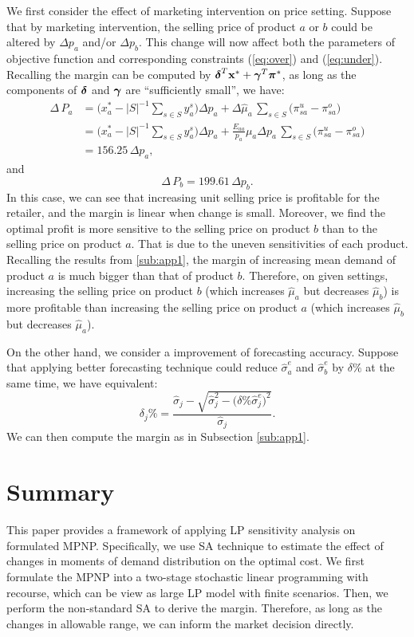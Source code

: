\documentclass[a4paper,11pt]{article}
\begin{document}
We first consider the effect of marketing intervention on price setting. Suppose that by marketing intervention, the selling price of product $a$ or $b$ could be altered by $\Delta p_a$ and/or $\Delta p_b$. This change will now affect both the parameters of objective function and corresponding constraints (\ref{eq:over}) and (\ref{eq:under}). Recalling the margin can be computed by $\mbox{\boldmath$\delta$}^T \mathbf{x}^* + \mbox{\boldmath$\gamma$}^T \mbox{\boldmath$\pi$}^*$,
as long as the components of $\mbox{\boldmath$\delta$}$ and $\mbox{\boldmath$\gamma$}$
are ``sufficiently small”, we have: 
\[
\begin{aligned}
    \Delta \, P_a &= \big( x_a^* - |S|^{-1} \sum_{s \in S} y_a^s \big) \Delta p_a + \Delta \hat{\mu}_a \, \sum_{s \in S} \big( \pi_{sa}^u - \pi_{sa}^o \big)\\
    &= \big( x_a^* - |S|^{-1} \sum_{s \in S} y_a^s \big) \Delta p_a + \frac{E_{aa}}{p_a}\mu_a \Delta p_a \, \sum_{s \in S} \big( \pi_{sa}^u - \pi_{sa}^o \big)\\
    &= 156.25 \, \Delta p_a,
\end{aligned}
\]
and
\[
\Delta \, P_b = 199.61 \, \Delta p_b.
\]
In this case, we can see that increasing unit selling price is profitable for the retailer, and the margin is linear when change is small. Moreover, we find the optimal profit is more sensitive to the selling price on product $b$ than to the selling price on product $a$. That is due to the uneven sensitivities of each product. Recalling the results from \ref{sub:app1}, the margin of increasing mean demand of product $a$ is much bigger than that of product $b$. Therefore, on given settings, increasing the selling price on product $b$ (which increases $\hat{\mu}_a$ but decreases $\hat{\mu}_b$) is more profitable than increasing the selling price on product $a$ (which increases $\hat{\mu}_b$ but decreases $\hat{\mu}_a$).

On the other hand, we consider a improvement of forecasting accuracy. Suppose that applying better forecasting technique could reduce $\hat{\sigma}_a^e$ and $\hat{\sigma}_b^e$ by $\delta \%$ at the same time, we have equivalent:
\[
\delta_j \% = \frac{\hat{\sigma}_j - \sqrt{\hat{\sigma}_j^2 - \big( \delta \% \hat{\sigma}_j^e \big)^2}}{\hat{\sigma}_j}.
\]
We can then compute the margin as in Subsection \ref{sub:app1}.

\section{Summary}
\label{se:conclusion}
This paper provides a framework of applying LP sensitivity analysis on formulated MPNP. Specifically, we use SA technique to estimate the effect of changes in moments of demand distribution on the optimal cost. We first formulate the MPNP into a two-stage stochastic linear programming with recourse, which can be view as large LP model with finite scenarios. Then, we perform the non-standard SA to derive the margin. Therefore, as long as the changes in allowable range, we can inform the market decision directly.
\end{document}
